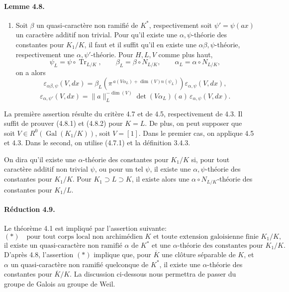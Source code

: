 \documentclass[10pt,letterpaper]{article}
\newcommand{\Gal}{\operatorname{Gal}}
\newcommand{\Tr}{\operatorname{Tr}}
\providecommand{\Gal}{\operatorname{Gal}}
\providecommand{\Gal}{\operatorname{Gal}}
\providecommand{\Tr}{\operatorname{Tr}}
\providecommand{\Gal}{\operatorname{Gal}}
\providecommand{\Tr}{\operatorname{Tr}}
\providecommand{\Gal}{\operatorname{Gal}}
\providecommand{\Tr}{\operatorname{Tr}}
\begin{document}
\paragraph{Lemme 4.8.} 
\begin{enumerate}[label=(\roman*)]
\item Soit \(\beta\) un quasi-caractère non ramifié de \(K^*\), respectivement soit \(\psi'=\psi(ax)\) un caractère additif non trivial. Pour qu'il existe une \(\alpha,\psi\)-théorie des constantes pour \(K_1/K\), il faut et il suffit qu'il en existe une \(\alpha\beta,\psi\)-théorie, respectivement une \(\alpha,\psi'\)-théorie. Pour \(H,L,V\) comme plus haut,
\[
\psi_L=\psi\circ\Tr_{L/K},\qquad
\beta_L=\beta\circ N_{L/K},\qquad
\alpha_L=\alpha\circ N_{L/K},
\]
on a alors
\[
\tag{4.8.1}
\varepsilon_{\alpha\beta,\psi}(V,dx)
=
\beta_L\!\left(\pi^{\,a(V\alpha_L)+\dim(V)n(\psi_L)}\right)
\varepsilon_{\alpha,\psi}(V,dx),
\]
\[
\tag{4.8.2}
\varepsilon_{\alpha,\psi'}(V,dx)
=
\|a\|_L^{-\dim(V)}
\det(V\alpha_L)(a)\,
\varepsilon_{\alpha,\psi}(V,dx).
\]
\end{enumerate}
La première assertion résulte du critère 4.7 et de 4.5, respectivement de 4.3. Il suffit de prouver (4.8.1) et (4.8.2) pour \(K=L\). De plus, on peut supposer que soit \(V\in R^0(\Gal(K_1/K))\), soit \(V=[1]\). Dans le premier cas, on applique 4.5 et 4.3. Dans le second, on utilise (4.7.1) et la définition 3.4.3.

On dira qu'il existe une \(\alpha\)-théorie des constantes pour \(K_1/K\) si, pour tout caractère additif non trivial \(\psi\), ou pour un tel \(\psi\), il existe une \(\alpha,\psi\)-théorie des constantes pour \(K_1/K\). Pour \(K_1\supset L\supset K\), il existe alors une \(\alpha\circ N_{L/K}\)-théorie des constantes pour \(K_1/L\).

\paragraph{Réduction 4.9.} Le théorème 4.1 est impliqué par l'assertion suivante:
\[
(*)\quad
\text{pour tout corps local non archimédien }K\text{ et toute extension galoisienne finie }K_1/K,
\]
\[
\text{il existe un quasi-caractère non ramifié }\alpha\text{ de }K^*
\text{ et une }\alpha\text{-théorie des constantes pour }K_1/K.
\]
D'après 4.8, l'assertion \((*)\) implique que, pour \(\overline K\) une clôture séparable de \(K\), et \(\alpha\) un quasi-caractère non ramifié quelconque de \(K^*\), il existe une \(\alpha\)-théorie des constantes pour \(\overline K/K\). La discussion ci-dessous nous permettra de passer du groupe de Galois au groupe de Weil.
\end{document}
